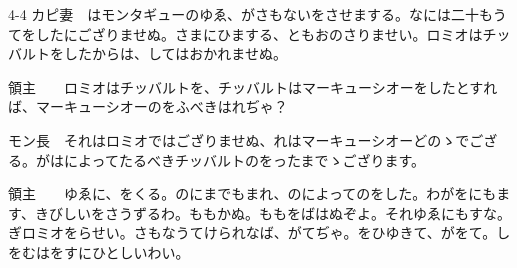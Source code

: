 \documentclass[tate,paper=b6j,jafontsize=9pt]{jlreq}
\begin{document}
\begin{azconvIndented}{4\zw}{-4\zw}
カピ妻　はモンタギューのゆゑ、がさもないをさせまする。なには二十もうてをしたにござりませぬ。さまにひまする、ともおのさりませい。ロミオはチッバルトをしたからは、してはおかれませぬ。

領主　　ロミオはチッバルトを、チッバルトはマーキューシオーをしたとすれば、マーキューシオーのをふべきはれぢゃ？

モン長　それはロミオではござりませぬ、れはマーキューシオーどのゝでござる。がはによってたるべきチッバルトのをったまでゝござります。

領主　　ゆゑに、をくる。のにまでもまれ、のによってのをした。わがをにもます、きびしいをさうずるわ。ももかぬ。ももをばはぬぞよ。それゆゑにもすな。ぎロミオをらせい。さもなうてけられなば、がてぢゃ。をひゆきて、がをて。しをむはをすにひとしいわい。

\end{azconvIndented}
\end{document}
